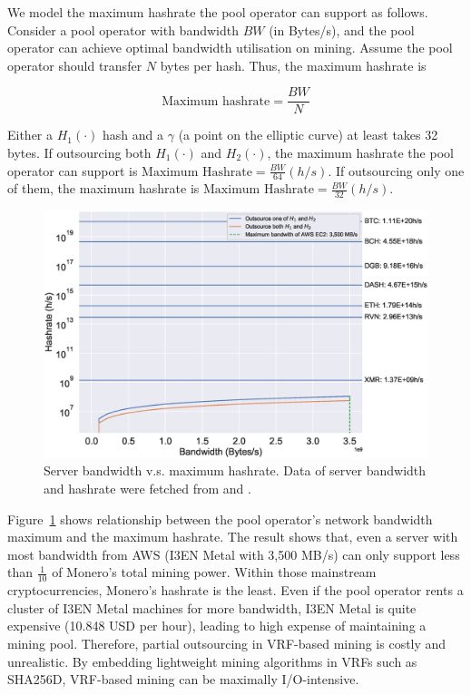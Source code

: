 We model the maximum hashrate the pool operator can support as follows.
Consider a pool operator with bandwidth $BW$ (in Bytes/s), and the pool operator can achieve optimal bandwidth utilisation on mining.
Assume the pool operator should transfer $N$ bytes per hash.
Thus, the maximum hashrate is

$$\text{Maximum hashrate} = \frac{BW}{N}$$

Either a $H_1(\cdot)$ hash and a $\gamma$ (a point on the elliptic curve) at least takes 32 bytes.
If outsourcing both $H_1(\cdot)$ and $H_2(\cdot)$, the maximum hashrate the pool operator can support is $\text{Maximum Hashrate} = \frac{BW}{64} (h/s)$.
If outsourcing only one of them, the maximum hashrate is $\text{Maximum Hashrate} = \frac{BW}{32} (h/s)$.

\begin{figure}[htp]
    \centering
    \includegraphics[width=\linewidth]{figs/max-hashrate.eps}
    \caption{Server bandwidth v.s. maximum hashrate.
    Data of server bandwidth and hashrate were fetched from \cite{aws} and \cite{coinwarz}.}
    \label{fig:max-hashrate}
\end{figure}

Figure~\ref{fig:max-hashrate} shows relationship between the pool operator's network bandwidth maximum and the maximum hashrate.
The result shows that, even a server with most bandwidth from AWS (I3EN Metal with 3,500 MB/s) can only support less than $\frac{1}{10}$ of Monero's total mining power.
Within those mainstream cryptocurrencies, Monero's hashrate is the least.
Even if the pool operator rents a cluster of I3EN Metal machines for more bandwidth, I3EN Metal is quite expensive (10.848 USD per hour), leading to high expense of maintaining a mining pool.
Therefore, partial outsourcing in VRF-based mining is costly and unrealistic.
By embedding lightweight mining algorithms in VRFs such as SHA256D, VRF-based mining can be maximally I/O-intensive.

